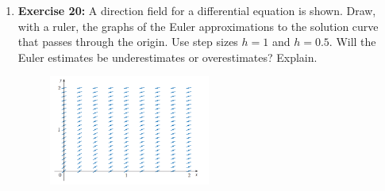 \documentclass[12pt, a4paper]{article}
\begin{document}
\begin{enumerate}
    \item \textbf{Exercise 20:} A direction field for a differential equation is shown. Draw, with a ruler, the graphs of the Euler approximations to the solution curve that passes through the origin. Use step sizes $h=1$ and $h=0.5$. Will the Euler estimates be underestimates or overestimates? Explain.
    
    \begin{center}
        \begin{figure}[htbp] %
            \centering %
             \includegraphics[width=0.5\textwidth]{graph3.png} %
         \end{figure}
    \end{center}
\end{enumerate}

\hrulefill
\vspace{1em}
\end{document}
